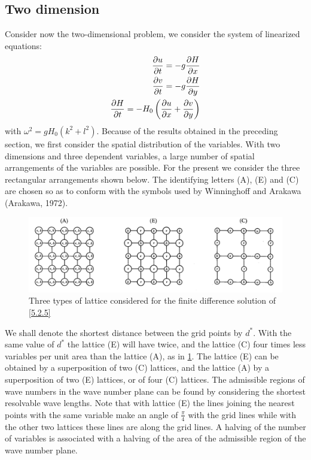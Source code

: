 \subsection{Two dimension}
Consider now the two-dimensional problem, we consider the system of linearized equations:
\begin{align}\label{5.2.5}
	\frac{\partial u}{\partial t}=-g\frac{\partial H}{\partial x}        \\
	\frac{\partial v}{\partial t}=-g\frac{\partial H}{\partial y} \notag \\
	\frac{\partial H}{\partial t}=-H_0\left(\frac{\partial u}{\partial x}+\frac{\partial v}{\partial y}\right)\notag
\end{align}
with $\omega^2=gH_0(k^2+l^2)$. Because of the results obtained in the preceding section, we first consider the spatial distribution of the variables. With two dimensions and three dependent variables, a large number of spatial arrangements of the variables are possible. For the present we consider the three rectangular arrangements shown below. The identifying letters (A), (E) and (C) are chosen so as to conform with the symbols used by Winninghoff and Arakawa (Arakawa, 1972).
\begin{figure}[h]
	\centering
	\includegraphics[width=0.5\linewidth]{uploads/Screenshot 2024-11-14 114112.png}
	\caption{Three types of lattice considered for the finite difference solution of \ref{5.2.5}}
	\label{fig:5.2.1}
\end{figure}
We shall denote the shortest distance between the grid points by $d^*$. With the same value of $d^*$ the lattice (E) will have twice, and the lattice (C) four times less variables per unit area than the lattice (A), as in \ref{fig:5.2.1}. The lattice (E) can be obtained by a superposition of two (C) lattices, and the lattice (A) by a superposition of two (E) lattices, or of four (C) lattices.
The admissible regions of wave numbers in the wave number plane can be found by considering the shortest resolvable wave lengths. Note that with lattice (E) the lines joining the nearest points with the same variable make an angle of $\frac{\pi}{4}$ with the grid lines while with the other two lattices these lines are along the grid lines. A halving of the number of variables is associated with a halving of the area of the admissible region of the wave number plane.

